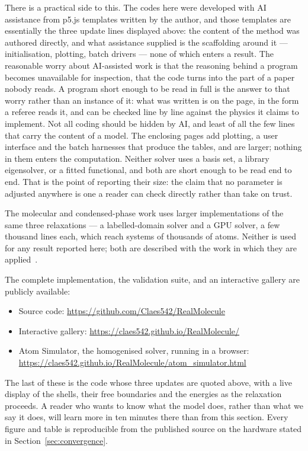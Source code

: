 \documentclass[11pt]{article}
\begin{document}
There is a practical side to this. The codes here were developed with AI assistance from
p5.js templates written by the author, and those templates are essentially the three update
lines displayed above: the content of the method was authored directly, and what assistance
supplied is the scaffolding around it --- initialisation, plotting, batch drivers --- none of
which enters a result. The reasonable worry about AI-assisted work is that the reasoning behind
a program becomes unavailable for inspection, that the code turns into the part of a paper
nobody reads. A program short enough to be read in full is the answer to that worry rather than
an instance of it: what was written is on the page, in the form a referee reads it, and can be
checked line by line against the physics it claims to implement. Not all coding should be
hidden by AI, and least of all the few lines that carry the content of a model. The enclosing pages add
plotting, a user interface and the batch harnesses that produce the tables, and are larger;
nothing in them enters the computation. Neither solver uses a basis set, a library
eigensolver, or a fitted functional, and both are short enough to be read end to end. That
is the point of reporting their size: the claim that no parameter is adjusted anywhere is
one a reader can check directly rather than take on trust.

The molecular and condensed-phase work uses larger implementations of the same three
relaxations --- a labelled-domain solver and a GPU solver, a few thousand lines each, which
reach systems of thousands of atoms. Neither is used for any result reported here; both are
described with the work in which they are applied~\cite{Johnson-RealQM}.

The complete implementation, the validation suite, and an interactive gallery are
publicly available:
\begin{itemize}\setlength{\itemsep}{1pt}
  \item Source code: \url{https://github.com/Claes542/RealMolecule}
  \item Interactive gallery: \url{https://claes542.github.io/RealMolecule/}
  \item Atom Simulator, the homogenised solver, running in a browser:
        \url{https://claes542.github.io/RealMolecule/atom_simulator.html}
\end{itemize}
The last of these is the code whose three updates are quoted above, with a live display of the
shells, their free boundaries and the energies as the relaxation proceeds. A reader who wants
to know what the model does, rather than what we say it does, will learn more in ten minutes
there than from this section.
Every figure and table is reproducible from the published source on the hardware
stated in Section~\ref{sec:convergence}.
\end{document}
